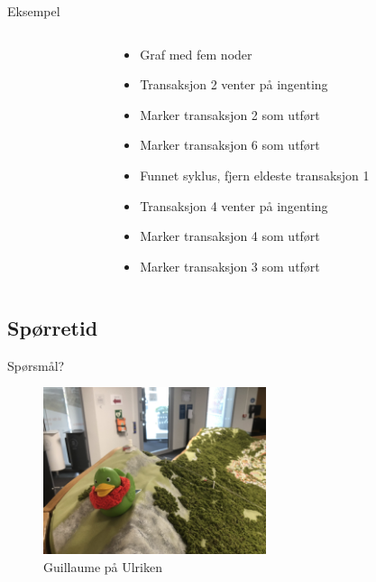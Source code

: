 \begin{frame}{Eksempel}
\begin{columns}
    \begin{column}{0.48\textwidth}
 \end{column}
    \begin{column}{0.48\textwidth}
\begin{itemize}
    \item<1-> Graf med fem noder 
    \item<2-> Transaksjon 2 venter på ingenting
    \item<3-> Marker transaksjon 2 som utført
    \item<4-> Marker transaksjon 6 som utført
    \item<5-> Funnet syklus, fjern eldeste transaksjon 1
    \item<6-> Transaksjon 4 venter på ingenting
    \item<7-> Marker transaksjon 4 som utført
    \item<8-> Marker transaksjon 3 som utført
\end{itemize}
 \end{column}
\end{columns}
\end{frame}

\subsection*{Spørretid}
\begin{frame}{Spørsmål?}
    \begin{figure}
        \centering
        \includegraphics[height = 4.9cm]{images/guillaume11.jpg}
        \caption{Guillaume på Ulriken}
        \label{fig:guillaume11}
    \end{figure}
\end{frame}